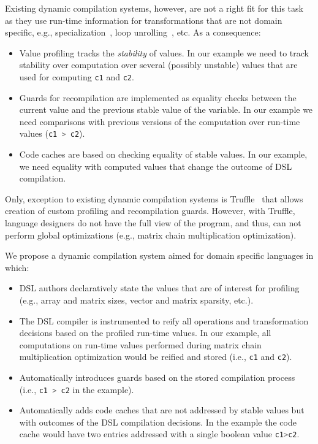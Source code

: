 \documentclass{llncs}
\newcommand{\scode}[1]{\lstinline[language=Scala,columns=fixed,basicstyle=\ttfamily,keywordstyle=\ttfamily]|#1|}
\newcommand{\code}[1]{\scode{#1}}
\begin{document}
Existing dynamic compilation systems, however, are not a right fit for this task
 as they use run-time information for transformations that are not domain specific, e.g., specialization~\cite{grant2000dyc}, loop unrolling~\cite{suganuma2001dynamic}, etc. As a consequence:
\begin{itemize}

 \item Value profiling tracks the \emph{stability} of values. In our example
 we need to track stability over computation over several (possibly unstable) values that are used for computing \code{c1} and \code{c2}.

 \item Guards for recompilation are implemented as equality checks between the current value
  and the previous stable value of the variable. In our example we need comparisons with previous versions of
  the computation over run-time values (\code{c1 > c2}).

 \item Code caches are based on checking equality of stable values. In our example, we need equality
  with computed values that change the outcome of DSL compilation.

\end{itemize}

Only, exception to existing dynamic compilation systems is Truffle~\cite{wurthinger2013one} that allows creation of custom profiling and recompilation guards. However, with Truffle, language designers do not have the full view of the program, and thus, can not perform global optimizations (e.g., matrix chain multiplication optimization).

We propose a dynamic compilation system aimed for domain specific languages in which:
\begin{itemize}

  \item DSL authors declaratively state the values that are of interest for profiling
    (e.g., array and matrix sizes, vector and matrix sparsity, etc.).

  \item The DSL compiler is instrumented to reify all operations and transformation decisions
   based on the profiled run-time values. In our example, all computations on run-time values
   performed during matrix chain multiplication optimization would be reified and stored (i.e., \code{c1} and \code{c2}).

  \item Automatically introduces guards based on the stored compilation process (i.e., \code{c1 > c2} in the example).

  \item Automatically adds code caches that are not addressed by stable values but with
   outcomes of the DSL compilation decisions. In the example the code cache would have two
   entries addressed with a single boolean value \code{c1>c2}.

\end{itemize}
\end{document}
